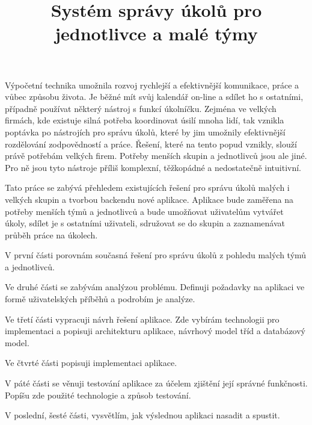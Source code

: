 \documentclass[thesis=B,czech]{FITthesis}[2012/06/26]
\title{Systém správy úkolů pro jednotlivce a malé týmy}
\begin{document}

\begin{introduction}
	Výpočetní technika umožnila rozvoj rychlejší a efektivnější komunikace, práce a vůbec způsobu života. Je běžné mít svůj kalendář on-line a sdílet ho s ostatními, případně používat některý nástroj s funkcí úkolníčku. Zejména ve velkých firmách, kde existuje silná potřeba koordinovat úsilí mnoha lidí, tak vznikla poptávka po nástrojích pro správu úkolů, které by jim umožnily efektivnější rozdělování zodpovědností a práce. Řešení, které na tento popud vznikly, slouží právě potřebám velkých firem. Potřeby menších skupin a jednotlivců jsou ale jiné. Pro ně jsou tyto nástroje příliš komplexní, těžkopádné a nedostatečně intuitivní.

	Tato práce se zabývá přehledem existujících řešení pro správu úkolů malých i velkých skupin a tvorbou backendu nové aplikace. Aplikace bude zaměřena na potřeby menších týmů a jednotlivců a bude umožňovat uživatelům vytvářet úkoly, sdílet je s ostatními uživateli, sdružovat se do skupin a zaznamenávat průběh práce na úkolech. 
	
	V první části porovnám současná řešení pro správu úkolů z pohledu malých týmů a jednotlivců. 
	
	Ve druhé části se zabývám analýzou problému. Definuji požadavky na aplikaci ve formě uživatelských příběhů a podrobím je analýze.
	
	Ve třetí části vypracuji návrh řešení aplikace. Zde vybírám technologii pro implementaci a popisuji architekturu aplikace, návrhový model tříd a databázový model.
	
	Ve čtvrté části popisuji implementaci aplikace.
	
	V páté části se věnuji testování aplikace za účelem zjištění její správné funkčnosti. Popíšu zde použité technologie a způsob testování.
	
	V poslední, šesté části, vysvětlím, jak výslednou aplikaci nasadit a spustit.
\end{introduction}

\end{document}
